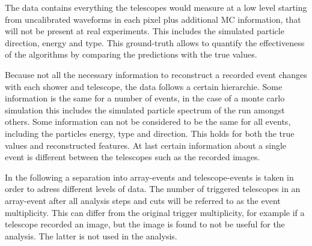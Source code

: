 The data contains everything the telescopes would measure at a low level 
starting from uncalibrated waveforms in each pixel
plus additional MC information, that will not be present at real experiments.
This includes the simulated particle direction, energy and type.
This ground-truth allows to quantify the effectiveness of the 
algorithms by comparing the predictions with the true values.

Because not all the necessary information to reconstruct a recorded event 
changes with each shower and telescope, the data follows a certain hierarchie.
Some information is the same for a number of events, in the case of
a monte carlo simulation this includes the simulated particle spectrum
of the run amongst others.
Some information can not be considered to be the same for all events,
including the particles energy, type and direction. This holds for both
the true values and reconstructed features.
At last certain information about a single event is different between
the telescopes such as the recorded images.



In the following a separation into array-events and telescope-events is
taken in order to adress different levels of data.
The number of triggered telescopes in an array-event
after all analysis steps and cuts 
will be referred to as the event multiplicity.
This can differ from the original trigger multiplicity, 
for example if a telescope recorded an image, but the
image is found to not be useful for the analysis.
The latter is not used
in the analysis.

